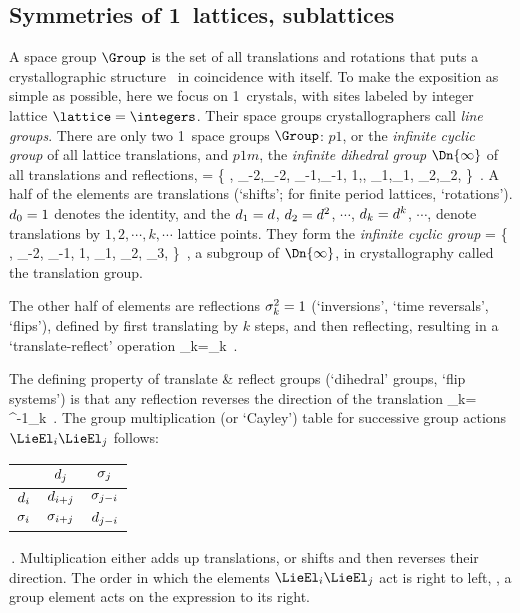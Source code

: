 \subsection{Symmetries of 1\dmn\ lattices, sublattices}
\label{s:1dLatt}

A space group $\Group$ is the set of all translations and rotations that
puts a crystallographic structure \lattice\ in coincidence with itself.
To make the exposition as simple as possible, here we focus on 1\dmn\
crystals, with sites labeled by integer lattice $ \lattice=\integers$.
Their space groups crystallographers\rf{Dresselhaus07} call \emph{line
groups}.
%
There are only two 
{1\dmn\ space groups}  $\Group$: $p1$, or the \emph{infinite cyclic
group}  \Cn{\infty} of all lattice translations,
and
$p1m$, the \emph{infinite dihedral group} $\Dn{\infty}$  of all
translations and reflections,
\beq
  \Dn{\infty} = \{
\cdots, \shift_{-2},\Refl_{-2}, \shift_{-1},\Refl_{-1},
        1,\Refl,
        \shift_{1},\Refl_{1}, \shift_{2},\Refl_{2}, \cdots
             \}
\,.
A half of the elements are translations (`shifts'; for finite period
lattices, `rotations').
$d_{0}=1$ denotes the identity,
and
the
$d_{1}=d$, $d_{2}=d^2$, $\cdots$,
$d_{k}=d^k$, $\cdots$,
denote translations by $1,2,\cdots,k,\cdots$ lattice points. They form
the \emph{infinite cyclic group}
\beq
\Cn{\infty}
    =       \{
\cdots, \shift_{-2}, \shift_{-1},
        1,
        \shift_{1}, \shift_{2}, \shift_{3}, \cdots
             \}
\,,
\label{C_infty}
\eeq
a subgroup of $\Dn{\infty}$,
in crystallography called the translation group.

The other half of elements are reflections $\sigma_{k}^2=1$
(`inversions', `time reversals', `flips'), defined by first translating
by $k$ steps, and then reflecting, resulting in a `translate-reflect'
operation
\beq
\Refl_{k}=\Refl\shift_k
\,.

The defining property of translate \& reflect groups
(`dihedral' groups, `flip systems') is that
any reflection reverses the direction of the translation
\beq
\Refl_{k}\shift = \shift^{-1}\Refl_{k}
\,.
%
The group multiplication (or `Cayley') table for successive group actions
$\LieEl_i\LieEl_j$ follows:
\beq
\begin{tabular}{c|cc}
            &$d_j$        &$\sigma_j$\\\hline
$d_i$  &$d_{i+j}$     &$\sigma_{j-i}$\\
$\sigma_i$   &$\sigma_{i+j}$     &$d_{j-i}$
\end{tabular}
\,.
Multiplication either adds up translations,
or shifts and then reverses their direction.
The order in which the elements $\LieEl_i\LieEl_j$ act is right to left,
\ie, a group element acts on the expression to its right.

